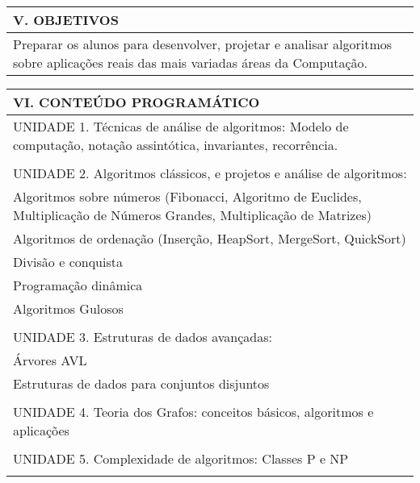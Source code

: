 \documentclass[12pt]{article}
\begin{document}
\begin{longtable}{|L{1.025\textwidth}|} \hline
%
{\bf V. OBJETIVOS } \\ \hline
%
Preparar os alunos para desenvolver, projetar e analisar algoritmos sobre aplicações reais das mais variadas áreas da Computação. 
\\ \hline
\end{longtable}


\begin{longtable}{|L{1.025\textwidth}|} \hline
%
{\bf VI. CONTEÚDO PROGRAMÁTICO } \\ \hline

UNIDADE 1. Técnicas de análise de algoritmos: Modelo de computação, notação assintótica, invariantes, recorrência.\\
\\
UNIDADE 2. Algoritmos clássicos, e projetos e análise de algoritmos: \\
Algoritmos sobre números (Fibonacci, Algoritmo de Euclides, Multiplicação de Números Grandes, Multiplicação de Matrizes)\\
Algoritmos de ordenação (Inserção, HeapSort, MergeSort, QuickSort) \\
Divisão e conquista\\
Programação dinâmica\\
Algoritmos Gulosos\\
\\
UNIDADE 3. Estruturas de dados avançadas:\\
Árvores AVL\\
Estruturas de dados para conjuntos disjuntos\\
\\

UNIDADE 4. Teoria dos Grafos: conceitos básicos, algoritmos e aplicações\\
\\
UNIDADE 5. Complexidade de algoritmos: Classes P e NP\\



\\ \hline
\end{longtable} 

\end{document}
